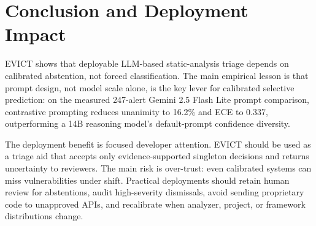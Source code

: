 \section{Conclusion and Deployment Impact}
\label{sec:conclusion}

EVICT shows that deployable LLM-based static-analysis triage depends on calibrated abstention, not forced classification. The main empirical lesson is that prompt design, not model scale alone, is the key lever for calibrated selective prediction: on the measured 247-alert Gemini 2.5 Flash Lite prompt comparison, contrastive prompting reduces unanimity to 16.2\% and ECE to 0.337, outperforming a 14B reasoning model's default-prompt confidence diversity.

The deployment benefit is focused developer attention. EVICT should be used as a triage aid that accepts only evidence-supported singleton decisions and returns uncertainty to reviewers. The main risk is over-trust: even calibrated systems can miss vulnerabilities under shift. Practical deployments should retain human review for abstentions, audit high-severity dismissals, avoid sending proprietary code to unapproved APIs, and recalibrate when analyzer, project, or framework distributions change.
